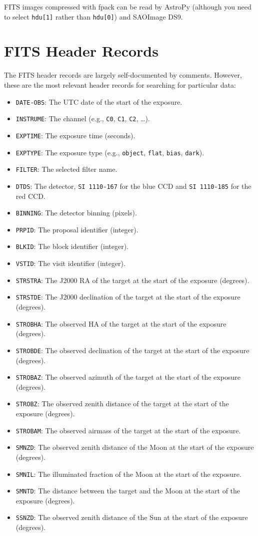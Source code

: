 FITS images compressed with fpack can be read by AstroPy (although you need to select \verb|hdu[1]| rather than \verb|hdu[0]|) and SAOImage DS9.

\section{FITS Header Records}

The FITS header records are largely self-documented by comments. However, these are the most relevant header records for searching for particular data:

\begin{itemize}
\item \verb|DATE-OBS|: The UTC date of the start of the exposure.
\item \verb|INSTRUME|: The channel (e.g., \verb|C0|, \verb|C1|, \verb|C2|, \ldots).
\item \verb|EXPTIME|: The exposure time (seconds).
\item \verb|EXPTYPE|: The exposure type (e.g., \verb|object|, \verb|flat|, \verb|bias|, \verb|dark|).
\item \verb|FILTER|: The selected filter name.
\item \verb|DTDS|: The detector, \verb|SI 1110-167| for the blue CCD and \verb|SI 1110-185| for the red CCD.
\item \verb|BINNING|: The detector binning (pixels).
\item \verb|PRPID|: The proposal identifier (integer).
\item \verb|BLKID|: The block identifier (integer).
\item \verb|VSTID|: The visit identifier (integer).
\item \verb|STRSTRA|: The J2000 RA of the target at the start of the exposure (degrees).
\item \verb|STRSTDE|: The J2000 declination of the target at the start of the exposure (degrees).
\item \verb|STROBHA|: The observed HA of the target at the start of the exposure (degrees).
\item \verb|STROBDE|: The observed declination of the target at the start of the exposure (degrees).
\item \verb|STROBAZ|: The observed azimuth of the target at the start of the exposure (degrees).
\item \verb|STROBZ|: The observed zenith distance of the target at the start of the exposure (degrees).
\item \verb|STROBAM|: The observed airmass of the target at the start of the exposure.
\item \verb|SMNZD|: The observed zenith distance of the Moon at the start of the exposure (degrees).
\item \verb|SMNIL|: The illuminated fraction of the Moon at the start of the exposure.
\item \verb|SMNTD|: The distance between the target and the Moon at the start of the exposure (degrees).
\item \verb|SSNZD|: The observed zenith distance of the Sun at the start of the exposure (degrees).
\end{itemize}

